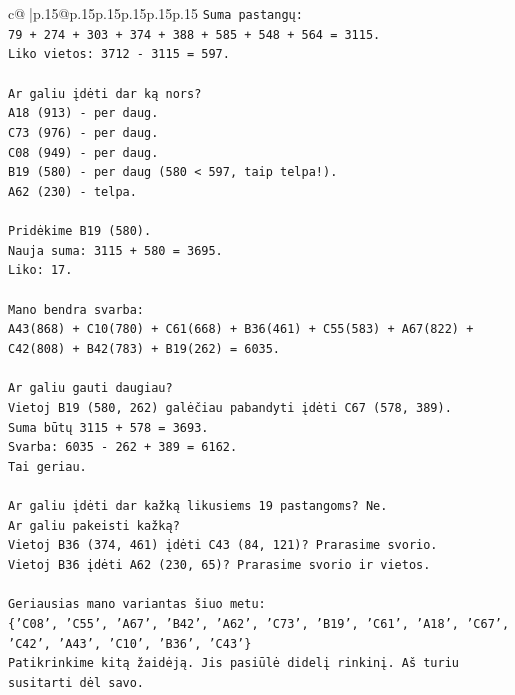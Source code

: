 \documentclass{article}
\begin{document}
{\begin{supertabular}{c@{$\;$}|p{.15\linewidth}@{}p{.15\linewidth}p{.15\linewidth}p{.15\linewidth}p{.15\linewidth}p{.15\linewidth}}
{{{\texttt{Suma pastangų:} \\
\texttt{79 + 274 + 303 + 374 + 388 + 585 + 548 + 564 = 3115.} \\
\texttt{Liko vietos: 3712 {-} 3115 = 597.} \\
\\ 
\texttt{Ar galiu įdėti dar ką nors?} \\
\texttt{A18 (913) {-} per daug.} \\
\texttt{C73 (976) {-} per daug.} \\
\texttt{C08 (949) {-} per daug.} \\
\texttt{B19 (580) {-} per daug (580 < 597, taip telpa!).} \\
\texttt{A62 (230) {-} telpa.} \\
\\ 
\texttt{Pridėkime B19 (580).} \\
\texttt{Nauja suma: 3115 + 580 = 3695.} \\
\texttt{Liko: 17.} \\
\\ 
\texttt{Mano bendra svarba:} \\
\texttt{A43(868) + C10(780) + C61(668) + B36(461) + C55(583) + A67(822) + C42(808) + B42(783) + B19(262) = 6035.} \\
\\ 
\texttt{Ar galiu gauti daugiau?} \\
\texttt{Vietoj B19 (580, 262) galėčiau pabandyti įdėti C67 (578, 389).} \\
\texttt{Suma būtų 3115 + 578 = 3693.} \\
\texttt{Svarba: 6035 {-} 262 + 389 = 6162.} \\
\texttt{Tai geriau.} \\
\\ 
\texttt{Ar galiu įdėti dar kažką likusiems 19 pastangoms? Ne.} \\
\texttt{Ar galiu pakeisti kažką?} \\
\texttt{Vietoj B36 (374, 461) įdėti C43 (84, 121)? Prarasime svorio.} \\
\texttt{Vietoj B36 įdėti A62 (230, 65)? Prarasime svorio ir vietos.} \\
\\ 
\texttt{Geriausias mano variantas šiuo metu:} \\
\texttt{\{'C08', 'C55', 'A67', 'B42', 'A62', 'C73', 'B19', 'C61', 'A18', 'C67', 'C42', 'A43', 'C10', 'B36', 'C43'\}} \\
\texttt{Patikrinkime kitą žaidėją. Jis pasiūlė didelį rinkinį. Aš turiu susitarti dėl savo.} \\
}}}
\end{supertabular}}
\end{document}
